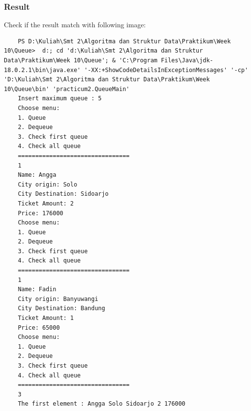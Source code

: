 \documentclass[12pt,titlepage]{article}
\begin{document}
\subsubsection{Result}
Check if the result match with following image:
\begin{verbatim}
    PS D:\Kuliah\Smt 2\Algoritma dan Struktur Data\Praktikum\Week 10\Queue>  d:; cd 'd:\Kuliah\Smt 2\Algoritma dan Struktur Data\Praktikum\Week 10\Queue'; & 'C:\Program Files\Java\jdk-18.0.2.1\bin\java.exe' '-XX:+ShowCodeDetailsInExceptionMessages' '-cp' 'D:\Kuliah\Smt 2\Algoritma dan Struktur Data\Praktikum\Week 10\Queue\bin' 'practicum2.QueueMain' 
    Insert maximum queue : 5
    Choose menu: 
    1. Queue
    2. Dequeue
    3. Check first queue
    4. Check all queue
    ================================
    1
    Name: Angga
    City origin: Solo
    City Destination: Sidoarjo
    Ticket Amount: 2
    Price: 176000
    Choose menu: 
    1. Queue
    2. Dequeue
    3. Check first queue
    4. Check all queue
    ================================
    1
    Name: Fadin
    City origin: Banyuwangi
    City Destination: Bandung
    Ticket Amount: 1
    Price: 65000
    Choose menu: 
    1. Queue
    2. Dequeue
    3. Check first queue
    4. Check all queue
    ================================
    3
    The first element : Angga Solo Sidoarjo 2 176000
\end{verbatim}
\end{document}
